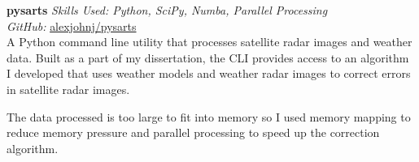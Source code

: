 \textbf{pysarts}  \newline
\textit{Skills Used: Python, SciPy, Numba, Parallel Processing}\\
\textit{GitHub:} \href{https://github.com/\myweb/pysarts}{alexjohnj/pysarts}\\
A Python command line utility that processes satellite radar images and weather
data. Built as a part of my dissertation, the CLI provides access to an
algorithm I developed that uses weather models and weather radar images to
correct errors in satellite radar images.

The data processed is too large to fit into memory so I used memory mapping to
reduce memory pressure and parallel processing to speed up the correction
algorithm.


